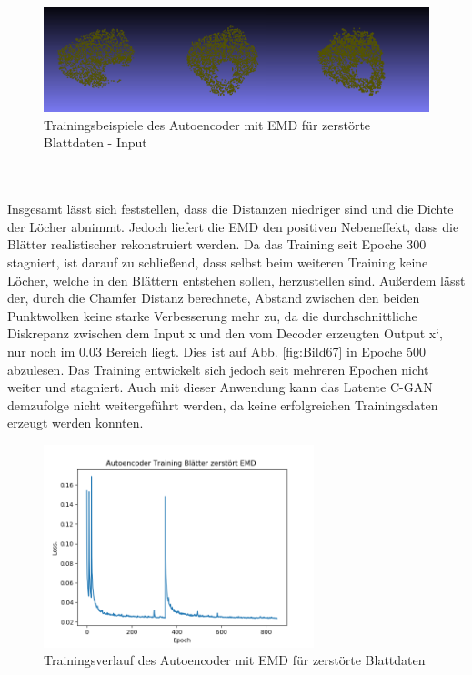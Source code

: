 \documentclass{llncs}
\begin{document}
\begin{figure}[htbp] 
	\centering
	\includegraphics[width=1.0\textwidth]{input_emd.png}
	\caption{Trainingsbeispiele des Autoencoder mit EMD für zerstörte Blattdaten - Input}
	\label{fig:Bild69}
\end{figure}
\\\\
Insgesamt lässt sich feststellen, dass die Distanzen niedriger sind und die Dichte der Löcher abnimmt. Jedoch liefert die EMD den positiven Nebeneffekt, dass die Blätter realistischer rekonstruiert werden. Da das Training seit Epoche 300 stagniert, ist darauf zu schließend, dass selbst beim weiteren Training keine Löcher, welche in den Blättern entstehen sollen, herzustellen sind. Außerdem lässt der, durch die Chamfer Distanz berechnete, Abstand zwischen den beiden Punktwolken keine starke Verbesserung mehr zu, da die durchschnittliche Diskrepanz zwischen dem Input x und den vom Decoder erzeugten Output x`, nur noch im 0.03 Bereich liegt. Dies ist auf Abb. \ref{fig:Bild67} in Epoche 500 abzulesen. Das Training entwickelt sich jedoch seit mehreren Epochen nicht weiter und stagniert. Auch mit dieser Anwendung kann das Latente C-GAN demzufolge nicht weitergeführt werden, da keine erfolgreichen Trainingsdaten erzeugt werden konnten.
\begin{figure}[htbp] 
	\centering
	\includegraphics[width=0.7\textwidth]{autoencoder_training_bleatter_zer_result_emd.png}
	\caption{Trainingsverlauf des Autoencoder mit EMD für zerstörte Blattdaten }
	\label{fig:Bild71}
\end{figure}
\end{document}
